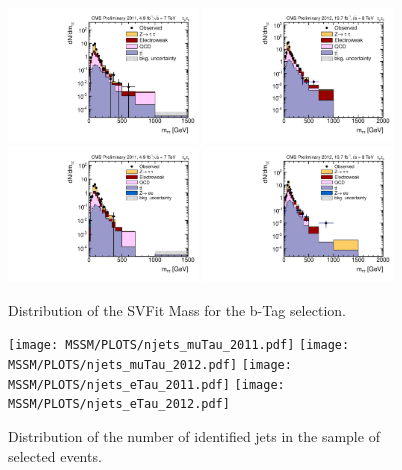\begin{figure}[htbp]
  \begin{center}
    \includegraphics[width=0.45\textwidth]{MSSM/ControlPlotsForThesis/muTau/btag/m_sv_muTau_2011_log.pdf}
    \includegraphics[width=0.45\textwidth]{MSSM/ControlPlotsForThesis/muTau/btag/m_sv_muTau_2012.pdf}
    \includegraphics[width=0.45\textwidth]{MSSM/ControlPlotsForThesis/eleTau/btag/m_sv_eTau_2011.pdf}
    \includegraphics[width=0.45\textwidth]{MSSM/ControlPlotsForThesis/eleTau/btag/m_sv_eTau_2012.pdf}
    \caption{
      Distribution of the SVFit Mass for the b-Tag selection.
    }
    \label{figure:svFitBTag}
  \end{center}
\end{figure}

\begin{figure}[htbp]
  \begin{center}
    \texttt{[image: MSSM/PLOTS/njets\_muTau\_2011.pdf]}
    \texttt{[image: MSSM/PLOTS/njets\_muTau\_2012.pdf]}
    \texttt{[image: MSSM/PLOTS/njets\_eTau\_2011.pdf]}
    \texttt{[image: MSSM/PLOTS/njets\_eTau\_2012.pdf]}
    \caption{
      Distribution of the number of identified jets in the sample of selected events.
    }
    \label{figure:njets}
  \end{center}
\end{figure}



